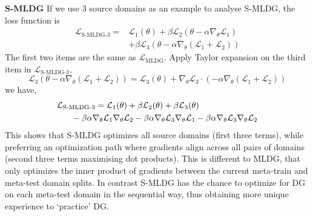 \documentclass[runningheads]{llncs}
\newcommand{\nameS}{S-MLDG}
\newcommand{\keypoint}[1]{\vspace{0.1cm}\noindent\textbf{#1}\quad}
\begin{document}
\keypoint{\nameS{}}
If we use 3 source domains as an example to analyse \nameS{}, the loss function is
\small
\begin{equation}
\begin{aligned}
\label{eq:hmldg-3s}
 \mathcal{L}_{\text{\nameS{}-3}}   = & \mathcal{L}_1(\theta) + \beta\mathcal{L}_2(\theta-\alpha\nabla_\theta\mathcal{L}_1) \\
 & + \beta\mathcal{L}_3(\theta-\alpha\nabla_\theta(\mathcal{L}_1 +\mathcal{L}_2))
\end{aligned}
\end{equation}
\normalsize
The first two items are the same as $\mathcal{L}_{\text{MLDG}}$. Apply Taylor expansion on the third item in $\mathcal{L}_{\text{\nameS{}-3}}$,
\begin{equation}
    \mathcal{L}_3(\theta-\alpha\nabla_\theta(\mathcal{L}_1 +\mathcal{L}_2)) = \mathcal{L}_3(\theta) + \nabla_\theta\mathcal{L}_3 \cdot(-\alpha\nabla_\theta(\mathcal{L}_1 +\mathcal{L}_2))
\end{equation}
we have,
\small
\begin{equation}
\begin{aligned}
\label{eq:hmldg-3s}
 \mathcal{L}_{\text{\nameS{}-3}} &  =  \mathcal{L}_1(\theta) +  \beta \mathcal{L}_2(\theta) + \beta \mathcal{L}_3(\theta) \\
& \hspace{-1cm} - \beta \alpha \nabla_\theta\mathcal{L}_1 \nabla_\theta\mathcal{L}_2 - \beta\alpha \nabla_\theta\mathcal{L}_3 \nabla_\theta\mathcal{L}_1 - \beta\alpha \nabla_\theta\mathcal{L}_3\nabla_\theta\mathcal{L}_2
\end{aligned}
\end{equation}
\normalsize
This shows that \nameS{} optimizes all source domains (first three terms), while preferring an optimization path where gradients align across all pairs of domains (second three terms maximising dot products). This is different to MLDG, that only optimizes the inner product of gradients between the current  meta-train and meta-test domain splits. In contrast \nameS{} has the chance to optimize for DG on each meta-test domain in the sequential way, thus obtaining more unique experience to `practice' DG.
\end{document}
